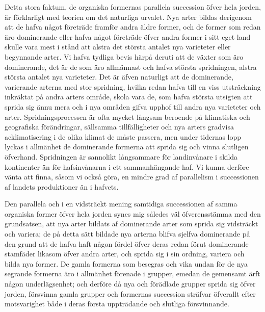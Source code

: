 Detta stora faktum, de organiska formernas parallela succession öfver hela jorden, är förklarligt med teorien om det naturliga urvalet. Nya arter bildas derigenom att de hafva något företräde framför andra äldre former, och de former som redan äro dominerande eller hafva något företräde öfver andra former i sitt eget land skulle vara mest i stånd att alstra det största antalet nya varieteter eller begynnande arter. Vi hafva tydliga bevis härpå deruti att de växter som äro dominerande, det är de som äro allmännast och hafva största spridningen, alstra största antalet nya varieteter. Det är äfven naturligt att de dominerande, varierande arterna med stor spridning, hvilka redan hafva till en viss utsträckning inkräktat på andra arters område, skola vara de, som hafva största utsigten att sprida sig ännu mera och i nya områden gifva upphof till andra nya varieteter och arter. Spridningsprocessen är ofta mycket långsam beroende på klimatiska och geografiska förändringar, sällsamma tillfälligheter och nya arters gradvisa acklimatisering i de olika klimat de måste passera, men under tidernas lopp lyckas i allmänhet de dominerande formerna att sprida sig och vinna slutligen öfverhand. Spridningen är sannolikt långsammare för landinvånare i skilda kontinenter än för hafsinvånarna i ett sammanhängande haf. Vi kunna derföre vänta att finna, såsom vi också göra, en mindre grad af parallelism i successionen af landets produktioner än i hafvets.

Den parallela och i en vidsträckt mening samtidiga successionen af samma organiska former öfver hela jorden synes mig således väl öfverensstämma med den grundsatsen, att nya arter bildats af dominerande arter som sprida sig vidsträckt och variera; de på detta sätt bildade nya arterna blifva sjelfva dominerande på den grund att de hafva haft någon fördel öfver deras redan förut dominerande stamfäder likasom öfver andra arter, och sprida sig i sin ordning, variera och bilda nya former. De gamla formerna som besegras och vika undan för de nya segrande formerna äro i allmänhet förenade i grupper, emedan de gemensamt ärft någon underlägsenhet; och derföre då nya och förädlade grupper sprida sig öfver jorden, försvinna gamla grupper och formernas succession sträfvar öfverallt efter motsvarighet både i deras första uppträdande och slutliga försvinnande.

